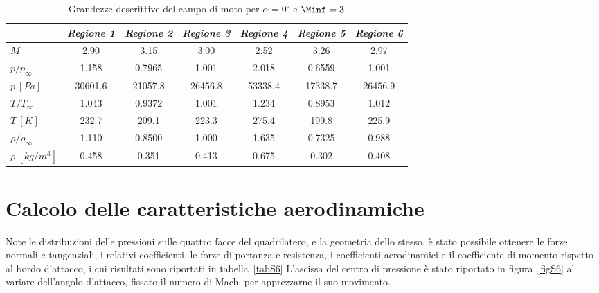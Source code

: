 \begin{table} [!h]\centering {}
	\begin{tabular}{l  c  c c c c c}
		\toprule
		& \emph{Regione 1}& \emph{Regione 2}& \emph{Regione 3}& \emph{Regione 4}& \emph{Regione 5}& \emph{Regione 6}   \\ 
		\midrule
		$M$	&	2.90	&	3.15	&	3.00	&	2.52	&	3.26	&	2.97	\\
		$p/p_{\infty}$ &   1.158	&	0.7965	&	1.001	&	2.018	&	0.6559	&	1.001	\\
		$p \ [\si{Pa}]$	&	30601.6	&	21057.8	&	26456.8	&	53338.4	&	17338.7	&	26456.9	\\
		$T/T_{\infty}$ &  1.043	&	0.9372	&	1.001	&	1.234	&	0.8953	&	1.012	\\
		$T \ [K]$	&	232.7	&	209.1	&	223.3	&	275.4	&	199.8	&	225.9	\\
		$\rho/\rho_{\infty}$ & 1.110	&	0.8500	&	1.000	&	1.635	&	0.7325	&	0.988	\\
		$\rho \ [kg/m^3]$	&	0.458	&	0.351	&	0.413	&	0.675	&	0.302	&	0.408	\\
		\bottomrule
	\end{tabular}
	\caption {\footnotesize Grandezze descrittive del campo di moto per $\alpha=0^\circ$ e $\Minf=3$}
	\label{tabS5}
\end{table}

\section{Calcolo delle caratteristiche aerodinamiche}

Note le distribuzioni delle pressioni sulle quattro facce del quadrilatero, e la geometria dello stesso, è stato possibile ottenere le forze normali e tangenziali, i relativi coefficienti, le forze di portanza e resistenza, i coefficienti aerodinamici e il coefficiente di momento rispetto al bordo d'attacco, i cui risultati sono riportati in tabella~\vref{tabS6}
L'ascissa del centro di pressione è stato riportato in figura~\vref{figS6} al variare dell'angolo d'attacco, fissato il numero di Mach, per apprezzarne il suo movimento.

